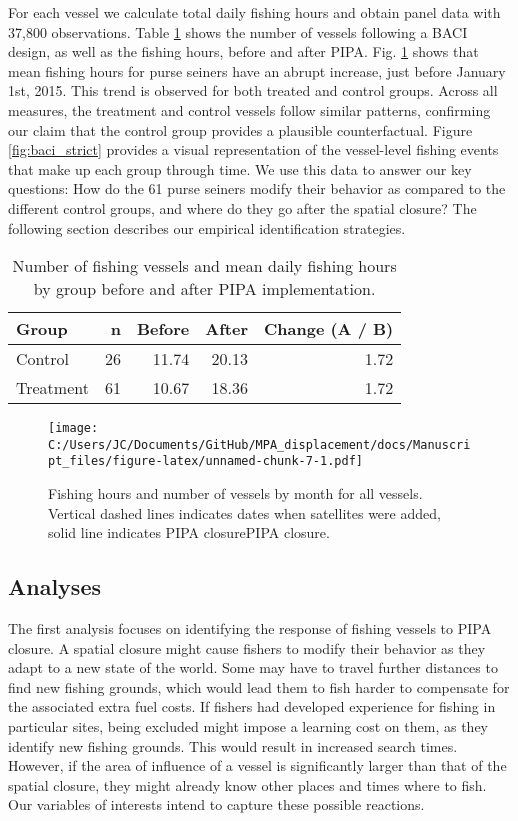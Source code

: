\documentclass[11pt,]{article}
\begin{document}
For each vessel we calculate total daily fishing hours and obtain panel
data with 37,800 observations. Table \ref{tab:baci_n_s} shows the number
of vessels following a BACI design, as well as the fishing hours, before
and after PIPA. Fig. \ref{fig:all_vessels} shows that mean fishing hours
for purse seiners have an abrupt increase, just before January 1st,
2015. This trend is observed for both treated and control groups. Across
all measures, the treatment and control vessels follow similar patterns,
confirming our claim that the control group provides a plausible
counterfactual. Figure \ref{fig:baci_strict} provides a visual
representation of the vessel-level fishing events that make up each
group through time. We use this data to answer our key questions: How do
the 61 purse seiners modify their behavior as compared to the different
control groups, and where do they go after the spatial closure? The
following section describes our empirical identification strategies.

\begin{table}[H]

\caption{\label{tab:unnamed-chunk-6}\label{tab:baci_n_s}Number of fishing vessels and mean daily fishing hours by group before and after PIPA implementation.}
\centering
\begin{tabular}[t]{lrrrr}
\toprule
Group & n & Before & After & Change (A / B)\\
\midrule
Control & 26 & 11.74 & 20.13 & 1.72\\
Treatment & 61 & 10.67 & 18.36 & 1.72\\
\bottomrule
\end{tabular}
\end{table}

\begin{figure}
\centering
\texttt{[image: C:/Users/JC/Documents/GitHub/MPA\_displacement/docs/Manuscript\_files/figure-latex/unnamed-chunk-7-1.pdf]}
\caption{\label{fig:unnamed-chunk-7}\label{fig:all_vessels}Fishing hours and
number of vessels by month for all vessels. Vertical dashed lines
indicates dates when satellites were added, solid line indicates PIPA
closurePIPA closure.}
\end{figure}

\hypertarget{analyses}{%
\subsection{Analyses}\label{analyses}}

The first analysis focuses on identifying the response of fishing
vessels to PIPA closure. A spatial closure might cause fishers to modify
their behavior as they adapt to a new state of the world. Some may have
to travel further distances to find new fishing grounds, which would
lead them to fish harder to compensate for the associated extra fuel
costs. If fishers had developed experience for fishing in particular
sites, being excluded might impose a learning cost on them, as they
identify new fishing grounds. This would result in increased search
times. However, if the area of influence of a vessel is significantly
larger than that of the spatial closure, they might already know other
places and times where to fish. Our variables of interests intend to
capture these possible reactions.
\end{document}
